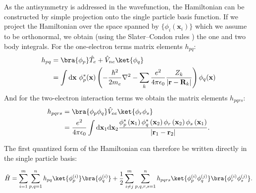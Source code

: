 As the antisymmetry is addressed in the wavefunction, the Hamiltonian can be constructed by simple projection onto the single particle basis function. If we project the Hamiltonian over the space spanned by  $\{\phi_i(\mathbf{x}_i)\}$ which we assume to be orthonormal, we obtain (using the Slater–Condon rules \citep{Slater1929, Condon1930}) the one and two body integrals. For the one-electron terms matrix elements $h_{p q}$:
\begin{equation}
\label{eq:HFintegral1}
\begin{aligned}
h_{p q} &= \bra{\phi_{p}} \hat{T}_e + \hat{V}_{ne} \ket{\phi_{q}}\\
&=\int \mathrm{d} \mathbf{x~} \phi_{p}^{*}(\mathbf{x})\left(-\frac{\hbar^{2}}{2 m_{e}} \nabla^{2}-\sum_{k} \frac{e^{2}}{4 \pi \epsilon_{0}} \frac{Z_{k}}{\left|\mathbf{r}-\mathbf{R}_{k}\right|}\right) \phi_{q}(\mathbf{x})
\end{aligned}
\end{equation}
And for the two-electron interaction terms we obtain the matrix elements $h_{p q r s}$:
\begin{equation}
\label{eq:HFintegral2}
\begin{aligned}
h_{p q r s} &= \bra{\phi_{p} \phi_{q}}\hat{V}_{ee}\ket{\phi_{r} \phi_{s}}\\
&= \frac{e^{2}}{4 \pi \epsilon_{0}} \int \mathrm{d} \mathbf{x}_{1} \mathrm{d} \mathbf{x}_{2} \frac{\phi_{p}^{*}\left(\mathbf{x}_{1}\right) \phi_{q}^{*}\left(\mathbf{x}_{2}\right) \phi_{r}\left(\mathbf{x}_{2}\right) \phi_{s}\left(\mathbf{x}_{1}\right)}{\left|\mathbf{r}_{1}-\mathbf{r}_{2}\right|}.
\end{aligned}
\end{equation}

The first quantized form of the Hamiltonian can therefore be written directly in the single particle basis:

\begin{equation} \label{eq:first_quantized_hamiltonian}
    \hat{H} = \sum_{i=1}^m \sum_{p, q = 1}^n h_{p q} \ket{\phi_p^{(i)}} \bra{\phi_q^{(i)}} + \frac{1}{2} \sum_{i \neq j}^m \sum_{p, q, r, s = 1}^n  h_{p q r s} \ket{\phi_p^{(i)}\phi_q^{(j)}} \bra{\phi_r^{(i)}\phi_s^{(j)}}.
\end{equation}


